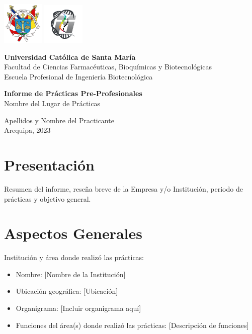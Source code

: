 \documentclass{article}
\begin{document}
\begin{titlepage}
  \begin{center}
    \includegraphics[width=2cm]{Img/Escudo-UCSM.png}\hfill
    \includegraphics[width=2cm]{Img/ciim.png}\par
    \vspace{1cm}
    \textbf{Universidad Católica de Santa María}\\
    Facultad de Ciencias Farmacéuticas, Bioquímicas y Biotecnológicas\\
    Escuela Profesional de Ingeniería Biotecnológica\par
    \vfill
    \textbf{Informe de Prácticas Pre-Profesionales}\\
    Nombre del Lugar de Prácticas\par
    \vfill
    Apellidos y Nombre del Practicante\\
    Arequipa, 2023
  \end{center}
\end{titlepage}

\tableofcontents

\newpage

\section{Presentación}
Resumen del informe, reseña breve de la Empresa y/o Institución, periodo de prácticas y objetivo general.

\section{Aspectos Generales}
Institución y área donde realizó las prácticas:
\begin{itemize}
  \item Nombre: [Nombre de la Institución]
  \item Ubicación geográfica: [Ubicación]
  \item Organigrama: [Incluir organigrama aquí]
  \item Funciones del área(s) donde realizó las prácticas: [Descripción de funciones]
\end{itemize}
\end{document}
